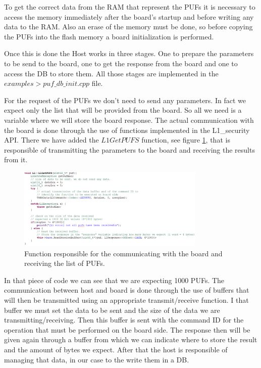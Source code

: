 To get the correct data from the RAM that represent the PUFs it is necessary to access the memory immediately after the board's startup and before writing any data to the RAM. Also an erase of the memory must be done, so before copying the PUFs into the flash memory a board initialization is performed.

Once this is done the Host works in three stages. One to prepare the parameters to be send to the board, one to get the response from the board and one to access the DB to store them. All those stages are implemented in the $examples > puf\_db\_init.cpp$ file.

For the request of the PUFs we don't need to send any parameters. In fact we expect only the list that will be provided from the board. So all we need is a variable where we will store the board response.
The actual communication with the board is done through the use of functions implemented in the L1\_security API. There we have added the $L1GetPUFS$ function, see figure \ref{fig:L1GetPUFS}, that is responsible of transmitting the parameters to the board and receiving the results from it.

\begin{figure}[h!]
	\vspace{0.5cm}
	\includegraphics[width = 0.8\textwidth]{images/L1GetPUFS.png}
	\caption{Function responsible for the communicating with the board and receiving the list of PUFs. }
	\label{fig:L1GetPUFS}
\end{figure}

In that piece of code we can see that we are expecting 1000 PUFs. The communication between host and board is done through the use of buffers that will then be transmitted using an appropriate transmit/receive function. I that buffer we must set the data to be sent and the size of the data we are transmitting/receiving. Then this buffer is sent with the command ID for the operation that must be performed on the board side. The response then will be given again through a buffer from which we can indicate where to store the result and the amount of bytes we expect. After that the host is responsible of managing that data, in our case to the write them in a DB.

